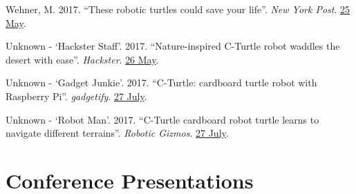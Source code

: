 \documentclass[12pt,a4paper]{article}
\begin{document}
\begin{description}
			\item Wehner, M. 2017. ``These robotic turtles could save your life''. \textit{New York Post}. \href{https://nypost.com/2017/05/25/these-robotic-turtles-could-save-your-life/}{25 May}.
			\item Unknown - `Hackster Staff'. 2017. ``Nature-inspired C-Turtle robot waddles the desert with ease''. \textit{Hackster}. \href{https://blog.hackster.io/nature-inspired-c-turtle-robot-waddles-the-desert-with-ease-3061cbc19b36}{26 May}.
			\item Unknown - `Gadget Junkie'. 2017. ``C-Turtle: cardboard turtle robot with Raspberry Pi''. \textit{gadgetify}. \href{http://www.gadgetify.com/c-turtle-cardboard-turtle-robot/}{27 July}.
			\item Unknown - `Robot Man'. 2017. ``C-Turtle cardboard robot turtle learns to navigate different terrains''. \textit{Robotic Gizmos}. \href{http://www.roboticgizmos.com/c-turtle-robot-turtle/}{27 July}.
		\end{description}

\section*{Conference Presentations}
\end{document}

